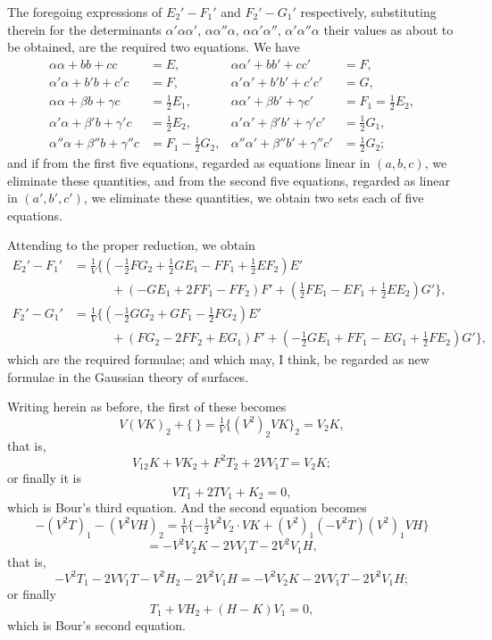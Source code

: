 \documentclass[11pt,a4paper]{book}
\begin{document}
The foregoing expressions of $E_2' - F_1'$ and $F_2' - G_1'$ respectively, substituting therein for the determinants $\alpha'\alpha\alpha'$, $\alpha\alpha''\alpha$, $\alpha\alpha'\alpha''$, $\alpha'\alpha''\alpha$ their values as about to be obtained, are the required two equations. We have
\[
\begin{aligned}
\alpha\alpha + bb + cc &= E, & \alpha\alpha' + bb' + cc' &= F,\\
\alpha'\alpha + b'b + c'c &= F, & \alpha'\alpha' + b'b' + c'c' &= G,\\
\alpha\alpha + \beta b + \gamma c &= \tfrac{1}{2}E_1, & \alpha\alpha' + \beta b' + \gamma c' &= F_1 = \tfrac{1}{2}E_2,\\
\alpha'\alpha + \beta'b + \gamma'c &= \tfrac{1}{2}E_2, & \alpha'\alpha' + \beta'b' + \gamma'c' &= \tfrac{1}{2}G_1,\\
\alpha''\alpha + \beta''b + \gamma''c &= F_1 - \tfrac{1}{2}G_2, & \alpha''\alpha' + \beta''b' + \gamma''c' &= \tfrac{1}{2}G_2;
\end{aligned}
\]
and if from the first five equations, regarded as equations linear in $(a, b, c)$, we eliminate these quantities, and from the second five equations, regarded as linear in $(a', b', c')$, we eliminate these quantities, we obtain two sets each of five equations.

Attending to the proper reduction, we obtain
\[
\begin{aligned}
E_2' - F_1' &= \tfrac{1}{V}\{(-\tfrac{1}{2}FG_2 + \tfrac{1}{2}GE_1 - FF_1 + \tfrac{1}{2}EF_2)E' \\
&\qquad\quad + (-GE_1 + 2FF_1 - FF_2)F' + (\tfrac{1}{2}FE_1 - EF_1 + \tfrac{1}{2}EE_2)G'\},\\
F_2' - G_1' &= \tfrac{1}{V}\{(-\tfrac{1}{2}GG_2 + GF_1 - \tfrac{1}{2}FG_2)E' \\
&\qquad\quad + (FG_2 - 2FF_2 + EG_1)F' + (-\tfrac{1}{2}GE_1 + FF_1 - EG_1 + \tfrac{1}{2}FE_2)G'\},
\end{aligned}
\]
which are the required formulae; and which may, I think, be regarded as new formulae in the Gaussian theory of surfaces.

Writing herein as before, the first of these becomes
\[
V(VK)_2 + \{\ \} = \tfrac{1}{V}\{(V^2)_2 VK\}_2 = V_2 K,
\]
that is,
\[
V_{12}K + VK_2 + F^2 T_2 + 2VV_1 T = V_2 K;
\]
or finally it is
\[
VT_1 + 2TV_1 + K_2 = 0,
\]
which is Bour's third equation. And the second equation becomes
\[
-(V^2 T)_1 - (V^2 VH)_2 = \tfrac{1}{V}\{-\tfrac{1}{2}V^2 V_2 \cdot VK + (V^2)_1 (-V^2T)(V^2)_1 VH\}
\]
\[
= -V^2V_2 K - 2VV_1 T - 2V^2V_1 H,
\]
that is,
\[
-V^2T_1 - 2VV_1 T - V^2H_2 - 2V^2V_1 H = -V^2V_2 K - 2VV_1 T - 2V^2V_1 H;
\]
or finally
\[
T_1 + VH_2 + (H - K)V_1 = 0,
\]
which is Bour's second equation.
\end{document}
